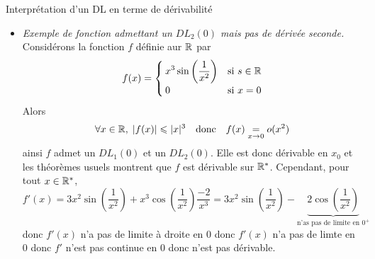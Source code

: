 \documentclass{article}
\begin{document}
\begin{question_kholle}{Interprétation d’un DL en terme de dérivabilité}
\begin{itemize}[label=$\vartriangleright$]
\begin{description}
			      \item[$(\impliedby)$] Réciproquement, si $f$ est dérivable en $x_{0}$, alors $f$ admet comme $DL_{1}(x_{0})$ son approximation au premier ordre, à savoir
			            \[
				            f(x)\underset{x \rightarrow a}{=} f(x_{0})+f'(x_{0})(x-x_{0})+o(x-x_{0})
			            \]
			            La preuve consiste à poser l’application
			            \[
				            \varepsilon \left|\applic{I}{\R}{x}{\begin{cases}
						            \frac{f(x)-f(x_{0}) - f'(x_{0})(x-x_{0})}{x-x_{0}} & \text{si $x\in I\setminus\{x_{0}\}$} \\
						            0                                                  & \text{si $x=x_{0}$}
					            \end{cases}}\right.
			            \]
			            puis à montrer dans un premier temps que cette application convient, et dans un second temps à écrire $|\varepsilon(x)|$ comme la distance entre le taux d’accroissement en $x_{0}$ de $f$ et $f'(x_{0})$, pour pouvoir conclure en utilisant la définition de la dérivabilité de $f$ en $x_{0}$ (limite de son taux d’accroissement) quand à la convergence vers 0 de $\varepsilon$.
		      \end{description}
		\item \textit{Exemple de fonction admettant un $DL_{2}(0)$ mais pas de dérivée seconde.}\\
		      Considérons la fonction $f$ définie aur $\mathbb R$ par
		      \[
			      f(x)=\begin{cases}
				      \displaystyle x^{3}\sin \left(\frac{1}{x^{2}}\right) & \text{si $s\in\mathbb R$} \\
				      0                                                    & \text{si $x=0$}
			      \end{cases}
		      \]
		      Alors
		      \[
			      \forall x\in\mathbb R,\;|f(x)|\leqslant |x|^{3} \quad\text{donc}\quad f(x)\underset{x \rightarrow 0}{=} o(x^{2})
		      \]
		      ainsi $f$ admet un $DL_{1}(0)$ et un $DL_{2}(0)$. Elle est donc dérivable en $x_{0}$ et les théorèmes usuels montrent que $f$ est dérivable sur $\mathbb R^{*}$. Cependant, pour tout $x\in\mathbb R^{*}$,
		      \[
			      f'(x)=3x^{2}\sin \left(\frac{1}{x^{2}}\right) + x^{3}\cos \left(\frac{1}{x^{2}}\right)\frac{-2}{x^{3}} = 3x^{2}\sin \left(\frac{1}{x^{2}}\right) -\underbrace{2\cos \left(\frac{1}{x^{2}}\right)}_{\text{n’as pas de limite en $0^{+}$}}
		      \]
		      donc $f'(x)$ n’a pas de limite à droite en 0 donc $f'(x)$ n’a pas de limte en 0 donc $f'$ n’est pas continue en 0 donc n’est pas dérivable.
	\end{itemize}
\end{question_kholle}
\end{document}
